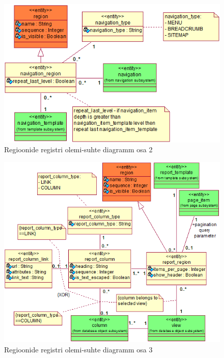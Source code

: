 \documentclass[a4paper,12pt]{article} %
\begin{document}
\begin{figure}[H]
\begin{center}
\includegraphics[bb=0 0 360 235,scale=1]{./diagrams/navigation-region-er-diagram.png}
\caption{Regioonide registri olemi-suhte diagramm osa 2}
\label{fig_navigatsiooni_regioonide_registri_olemi_suhte_diagramm}
\end{center}
\end{figure}

\begin{figure}[H]
\begin{center}
\includegraphics[bb=0 0 575 480,scale=1]{./diagrams/report-region-er-diagram.png}
\caption{Regioonide registri olemi-suhte diagramm osa 3}
\label{fig_raportite_regioonide_registri_olemi_suhte_diagramm}
\end{center}
\end{figure}
\end{document}
